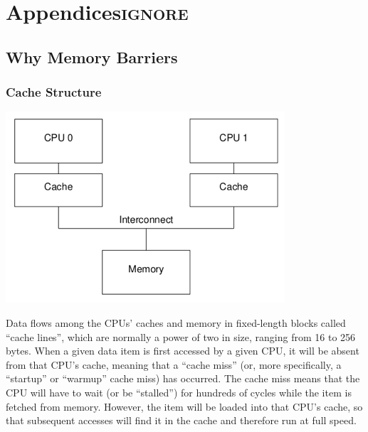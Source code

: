 \documentclass[11pt]{article}
\begin{document}
\section{Appendices\hfill{}\textsc{ignore}}
\label{sec:org109ef1f}
\appendix
\subsection{Why Memory Barriers}
\label{sec:orgd9e569f}
\subsubsection{Cache Structure}
\label{sec:org210a0d8}
\begin{center}
\includegraphics[width=.7\textwidth]{../images/perfbook/1.png}
\end{center}

Data flows among the CPUs’ caches and memory in fixed-length blocks called “cache lines”, which
are normally a power of two in size, ranging from 16 to 256 bytes. When a given data item is
first accessed by a given CPU, it will be absent from that CPU’s cache, meaning that a “cache
miss” (or, more specifically, a “startup” or “warmup” cache miss) has occurred. The cache miss
means that the CPU will have to wait (or be “stalled”) for hundreds of cycles while the item is
fetched from memory. However, the item will be loaded into that CPU’s cache, so that subsequent
accesses will find it in the cache and therefore run at full speed.
\end{document}
